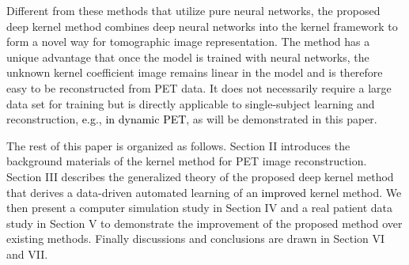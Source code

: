 \documentclass[]{IEEETran}
\newcommand{\txtb}[1]{\textcolor{black}{#1}}
\begin{document}
	Different from these methods that utilize pure neural networks, the proposed deep kernel method combines deep neural networks into the kernel framework \cite{Wang2015} to form a novel way for tomographic image representation. The method has a unique advantage that once the model is trained with neural networks, the unknown kernel coefficient image remains linear in the model and is therefore easy to be reconstructed from PET data. It does not necessarily require a large data set for training but is directly applicable to single-subject learning and reconstruction, \txtb{e.g., in dynamic PET}, as will be demonstrated in this paper.
	
	The rest of this paper is organized as follows. Section II introduces the background materials of the kernel method for PET image reconstruction. Section III describes the generalized theory of the proposed deep kernel method that derives a data-driven automated learning of an \txtb{improved} kernel method. We then present a computer simulation study in Section IV and a real patient data study in Section V to demonstrate the improvement of the proposed method over existing methods. Finally discussions and conclusions are drawn in Section VI and VII.
	
\end{document}
